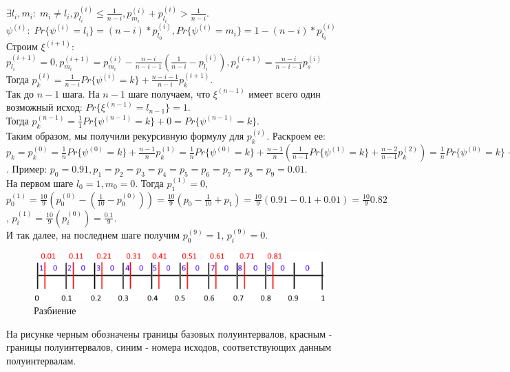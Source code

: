 $\exists l_i, m_i: \; m_i \not= l_i, p^{(i)}_{l_i} \leq \frac{1}{n - i}, p^{(i)}_{m_i} + p^{(i)}_{l_i} > \frac{1}{n - i}$.\\
$\psi^{(i)}: \; Pr\{\psi^{(i)} = l_i\} = (n - i) * p^{(i)}_{l_0}, Pr\{\psi^{(i)} = m_i\} = 1 - (n - i) * p^{(i)}_{l_0}$\\
Строим $\xi^{(i + 1)}$: $p^{(i + 1)}_{l_i} = 0, p^{(i + 1)}_{m_i} = p^{(i)}_{m_i} - \frac{n - i}{n - i - 1}(\frac{1}{n - i} - p^{(i)}_{l_i}), p^{(i + 1)}_{s} = \frac{n - i}{n - i - 1}p^{(i)}_{s}$\\
Тогда $p^{(i)}_{k} = \frac{1}{n - i}Pr\{\psi^{(i)} = k\} + \frac{n - i - 1}{n - i}p^{(i + 1)}_{k}$.\\
Так до $n - 1$ шага. На $n - 1$ шаге получаем, что $\xi^{(n - 1)}$ имеет всего один возможный исход: $Pr\{\xi^{(n - 1)} = l_{n - 1}\} = 1$. \\
Тогда $p^{(n - 1)}_k = \frac{1}{1}Pr\{\psi^{(n - 1)} = k\} + 0 = Pr\{\psi^{(n - 1)} = k\}$.\\
Таким образом, мы получили рекурсивную формулу для $p^{(i)}_k$. Раскроем ее:\\
$p_k = p^{(0)}_k = \frac{1}{n}Pr\{\psi^{(0)} = k\} + \frac{n - 1}{n}p^{(1)}_k = \frac{1}{n}Pr\{\psi^{(0)} = k\} + \frac{n - 1}{n}(\frac{1}{n - 1}Pr\{\psi^{(1)} = k\} + \frac{n - 2}{n - 1}p^{(2)}_k) = \frac{1}{n}Pr\{\psi^{(0)} = k\} + \frac{1}{n}Pr\{\psi^{(1)} = k\} + \frac{n - 2}{n}p^{(2)}_k = ... = \frac{1}{n}\sum\limits_{j \in 0:(n - 1)}Pr\{\psi^{(j)} = k\}$\\.
Пример: $p_0 = 0.91, p_1 = p_2 = p_3 = p_4 = p_5 = p_6 = p_7 = p_8 = p_9 = 0.01$.\\
На первом шаге $l_0 = 1, m_0 = 0$. Тогда $p^{(1)}_1 = 0$, $p^{(1)}_0 = \frac{10}{9}(p^{(0)}_0 - (\frac{1}{10} - p^{(0)}_0)) = \frac{10}{9}(p_0 - \frac{1}{10} + p_1) = \frac{10}{9}(0.91 - 0.1 + 0.01) = \frac{10}{9}0.82$, $p^{(1)}_i = \frac{10}{9}(p^{(0)}_i) = \frac{0.1}{9}$.\\
И так далее, на последнем шаге получим $p^{(9)}_0 = 1$, $p^{(9)}_i = 0$.\\
\begin{figure}[H]
\includegraphics[width=\linewidth]{Walker.png}
\caption{Разбиение}
\label{fig:Walker}
\end{figure}
На рисунке черным обозначены границы базовых полуинтервалов, красным - границы полуинтервалов, синим - номера исходов, соответствующих данным полуинтервалам.